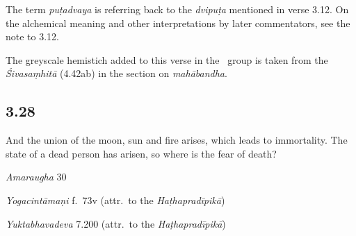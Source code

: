 \begin{ekdosis}
\begin{philcomm}[hp03_027]
The term \emph{puṭadvaya} is referring back to the \emph{dvipuṭa} mentioned in verse 3.12. On the alchemical meaning and other interpretations by later commentators, see the note to 3.12.\lb

The greyscale hemistich added to this verse in the \textgamma\ group is taken from the \emph{Śivasaṃhitā} (4.42ab) in the section on \emph{mahābandha}.
\end{philcomm}

\subsection*{3.28}
\begin{translation}[hp03_028]
And the union of the moon, sun and fire arises, which leads to immortality.
The state of a dead person has arisen, so where is the fear of death?
\end{translation}

\begin{sources}[hp03_028]
\emph{Amaraugha} 30
\begin{versinnote}
\tl{\var{°saṃbandhaṃ ] °saṃbandhāj, °saṃbandhā \vl}\\!}
\end{versinnote}
\end{sources}

\begin{testimonia}[hp03_028]
\emph{Yogacintāmaṇi} f.~73v (attr.~to the \emph{Haṭhapradīpikā})
\begin{versinnote}
\tl{\var{°samutpannaṃ ] °samutpannā \vl}\\!}
\end{versinnote}

\emph{Yuktabhavadeva} 7.200 (attr.~to the \emph{Haṭhapradīpikā})
\begin{versinnote}
\end{versinnote}
\end{testimonia}


\end{ekdosis}
